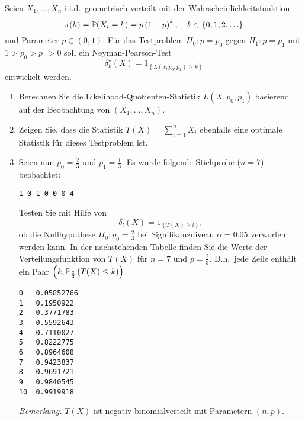  Seien $X_1,\ldots,X_n$ 
i.i.d.\ geometrisch verteilt mit der Wahrscheinlichkeitsfunktion
\begin{equation*}
    \pi(k) = \mathbb P(X_i = k) = p \left( 1-p \right)^k, \quad k\in\left\{ 0,1,2, \ldots \right\}
\end{equation*}
und Parameter $p\in \left( 0,1 \right)$.
Für das Testproblem $H_0 : p=p_0$ gegen $H_1 : p=p_1$ mit $1>p_0 > p_1 >0$ 
soll ein Neyman-Pearson-Test
\begin{equation*}
    \delta_k^\star (X) = 1_{ \left\{ L(x,p_0,p_1)\geq k \right\}  }
\end{equation*}
entwickelt werden.
\begin{enumerate}
    \item Berechnen Sie die Likelihood-Quotienten-Statistik $L(X,p_0,p_1)$ basierend auf der
        Beobachtung von $\left( X_1,\ldots,X_n \right)$.
    \item Zeigen Sie, dass die Statistik $T(X)= \sum_{i=1}^{n} X_i$ ebenfalls eine
        optimale Statistik für dieses Testproblem ist.
    \item Seien nun $p_0=\frac{2}{3}$ und $p_1=\frac{1}{3}$. Es wurde folgende Stichprobe ($n=7$) beobachtet:
        \begin{lstlisting}
1 0 1 0 0 0 4
        \end{lstlisting}   %
        Testen Sie mit Hilfe von 
        \begin{equation*}
            \delta_l(X) = 1_{   \left\{ T(X) \geq l \right\}},
        \end{equation*}
        ob die Nullhypothese $H_0 : p_0=\frac{2}{3}$ bei Signifikanzniveau $\alpha=0.05$
        verworfen werden kann. In der nachstehenden Tabelle finden Sie die Werte der Verteilungsfunktion
        von $T(X)$ für $n=7$ und $p=\frac{2}{3}$. D.h.\ jede Zeile enthält ein Paar 
        $\left( k, \mathbb P_{\frac{2}{3}} \left( T(X) \leq k \right) \right)$.
        \begin{lstlisting}
0   0.05852766
1   0.1950922
2   0.3771783
3   0.5592643
4   0.7110027
5   0.8222775
6   0.8964608
7   0.9423837
8   0.9691721
9   0.9840545
10  0.9919918
\end{lstlisting}   %
\emph{Bemerkung.} $T(X)$ ist negativ binomialverteilt mit Parametern $\left( n,p \right)$.
\end{enumerate}

